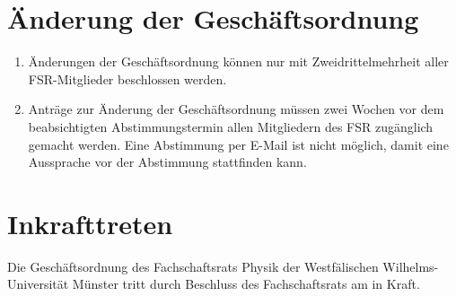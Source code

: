 \section{Änderung der Geschäftsordnung}
\begin{enumerate}
	\item Änderungen der Geschäftsordnung können nur mit Zweidrittelmehrheit aller FSR-Mitglieder beschlossen werden.
	\item Anträge zur Änderung der Geschäftsordnung müssen zwei Wochen vor dem beabsichtigten Abstimmungstermin allen Mitgliedern des FSR zugänglich gemacht werden.
	Eine Abstimmung per E-Mail ist nicht möglich, damit eine Aussprache vor der Abstimmung stattfinden kann.
\end{enumerate}

\section{Inkrafttreten}
Die Geschäftsordnung des Fachschaftsrats Physik der Westfälischen Wilhelms-Universität Münster tritt durch Beschluss des Fachschaftsrats am  in Kraft.

